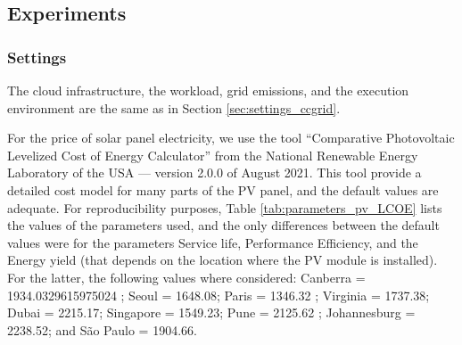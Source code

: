 \subsection{Experiments}

\subsubsection{Settings}

The cloud infrastructure, the workload, grid emissions, and the execution environment are the same as in Section  \ref{sec:settings_ccgrid}.

For the price of solar panel electricity, we use the tool ``Comparative Photovoltaic Levelized Cost of Energy Calculator'' from the National Renewable Energy Laboratory of the USA \cite{pv_lcoe_calc} --- version 2.0.0 of August 2021. This tool provide a detailed cost model for many parts of the PV panel, and the default values are adequate. For reproducibility purposes, Table \ref{tab:parameters_pv_LCOE} lists the values of the parameters used, and the only differences between the default values were for the parameters Service life, Performance Efficiency, and the Energy yield (that depends on the location where the PV module is installed). For the latter, the following values where considered: Canberra = 1934.0329615975024 ; Seoul  = 1648.08; Paris = 1346.32 ; Virginia = 1737.38; Dubai =  2215.17; Singapore = 1549.23; Pune =  2125.62 ; Johannesburg = 2238.52; and São Paulo =  1904.66.

